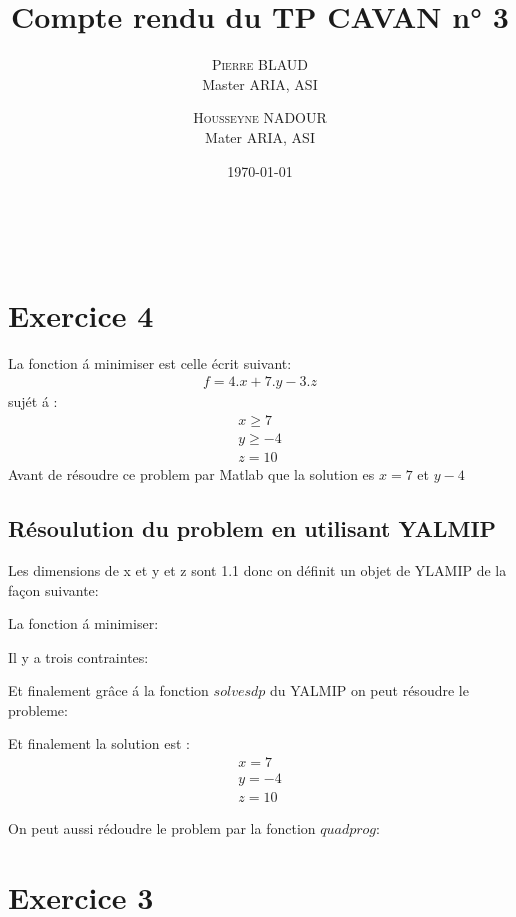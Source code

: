 \documentclass[twoside,twocolumn]{article}
\title{Compte rendu du TP CAVAN n° 3} %
\author{%
\textsc{Pierre BLAUD}\\[1ex] %
\normalsize Master ARIA, ASI \\ %
\and %
\textsc{Housseyne NADOUR} \\[1ex] %
\normalsize Mater ARIA, ASI \\ %
}
\date{\today} %
\begin{document}
\maketitle
\
\tableofcontents
\newpage

\section{Exercice 4}
La fonction á minimiser est celle écrit suivant:
\begin{align*}
f=4.x+7.y-3.z
\end{align*}
sujét á : 
\begin{align*}
x\geq 7 \\
y \geq -4\\
z = 10 
\end{align*}
Avant de résoudre ce problem par Matlab que la solution es $x=7$ et $y-4$ 

\subsection{Résoulution du problem en utilisant YALMIP}
 	Les dimensions de x et y et z sont 1.1 donc on définit un objet de YLAMIP de la façon suivante:
\label{matlab}


La fonction á minimiser:

\label{matlab}


Il y a trois contraintes:
\label{matlab}


Et finalement grâce á la fonction $solvesdp$ du YALMIP on peut résoudre le probleme:
\label{matlab}
 

Et finalement la solution est :
\begin{align*}
x = 7 \\
y = -4 \\
z = 10
\end{align*}

On peut aussi rédoudre le problem par la fonction $quadprog$:
\label{matlab}
 

\section{Exercice 3}
\end{document}
